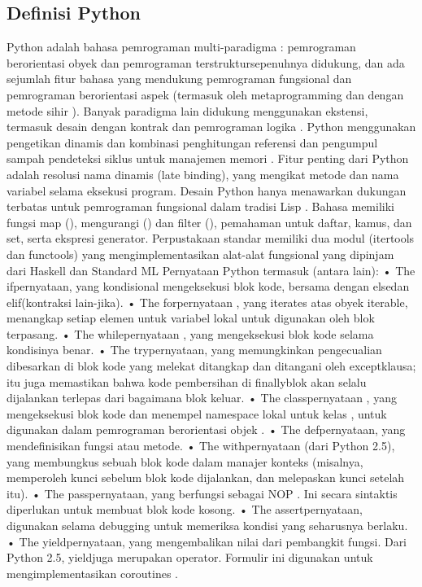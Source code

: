 \subsection{Definisi Python}
Python adalah bahasa pemrograman multi-paradigma : pemrograman berorientasi obyek dan pemrograman terstruktursepenuhnya didukung, dan ada sejumlah fitur bahasa yang mendukung pemrograman fungsional dan pemrograman berorientasi aspek (termasuk oleh metaprogramming dan dengan metode sihir ).  Banyak paradigma lain didukung menggunakan ekstensi, termasuk desain dengan kontrak  dan pemrograman logika .
Python menggunakan pengetikan dinamis dan kombinasi penghitungan referensi dan pengumpul sampah pendeteksi siklus untuk manajemen memori . Fitur penting dari Python adalah resolusi nama dinamis (late binding), yang mengikat metode dan nama variabel selama eksekusi program.
Desain Python hanya menawarkan dukungan terbatas untuk pemrograman fungsional dalam tradisi Lisp . Bahasa memiliki fungsi map (), mengurangi () dan filter (), pemahaman untuk daftar, kamus, dan set, serta ekspresi generator. Perpustakaan standar memiliki dua modul (itertools dan functools) yang mengimplementasikan alat-alat fungsional yang dipinjam dari Haskell dan Standard ML 
Pernyataan Python termasuk (antara lain):
•	The ifpernyataan, yang kondisional mengeksekusi blok kode, bersama dengan elsedan elif(kontraksi lain-jika).
•	The forpernyataan , yang iterates atas obyek iterable, menangkap setiap elemen untuk variabel lokal untuk digunakan oleh blok terpasang.
•	The whilepernyataan , yang mengeksekusi blok kode selama kondisinya benar.
•	The trypernyataan, yang memungkinkan pengecualian dibesarkan di blok kode yang melekat ditangkap dan ditangani oleh exceptklausa; itu juga memastikan bahwa kode pembersihan di finallyblok akan selalu dijalankan terlepas dari bagaimana blok keluar.
•	The classpernyataan , yang mengeksekusi blok kode dan menempel namespace lokal untuk kelas , untuk digunakan dalam pemrograman berorientasi objek .
•	The defpernyataan, yang mendefinisikan fungsi atau metode.
•	The withpernyataan (dari Python 2.5), yang membungkus sebuah blok kode dalam manajer konteks (misalnya, memperoleh kunci sebelum blok kode dijalankan, dan melepaskan kunci setelah itu).
•	The passpernyataan, yang berfungsi sebagai NOP . Ini secara sintaktis diperlukan untuk membuat blok kode kosong.
•	The assertpernyataan, digunakan selama debugging untuk memeriksa kondisi yang seharusnya berlaku.
•	The yieldpernyataan, yang mengembalikan nilai dari pembangkit fungsi. Dari Python 2.5, yieldjuga merupakan operator. Formulir ini digunakan untuk mengimplementasikan coroutines .
